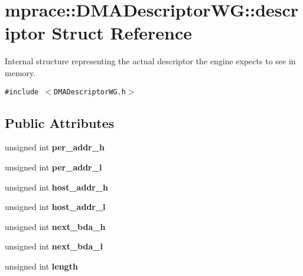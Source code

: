 \hypertarget{structmprace_1_1DMADescriptorWG_1_1descriptor}{
\section{mprace::DMADescriptor\-WG::descriptor Struct Reference}
\label{structmprace_1_1DMADescriptorWG_1_1descriptor}
}
Internal structure representing the actual descriptor the engine expects to see in memory.  


{\tt \#include $<$DMADescriptor\-WG.h$>$}

\subsection*{Public Attributes}
\begin{CompactItemize}
\item 
\hypertarget{structmprace_1_1DMADescriptorWG_1_1descriptor_o0}{
unsigned int {\bf per\_\-addr\_\-h}}
\label{structmprace_1_1DMADescriptorWG_1_1descriptor_o0}

\item 
\hypertarget{structmprace_1_1DMADescriptorWG_1_1descriptor_o1}{
unsigned int {\bf per\_\-addr\_\-l}}
\label{structmprace_1_1DMADescriptorWG_1_1descriptor_o1}

\item 
\hypertarget{structmprace_1_1DMADescriptorWG_1_1descriptor_o2}{
unsigned int {\bf host\_\-addr\_\-h}}
\label{structmprace_1_1DMADescriptorWG_1_1descriptor_o2}

\item 
\hypertarget{structmprace_1_1DMADescriptorWG_1_1descriptor_o3}{
unsigned int {\bf host\_\-addr\_\-l}}
\label{structmprace_1_1DMADescriptorWG_1_1descriptor_o3}

\item 
\hypertarget{structmprace_1_1DMADescriptorWG_1_1descriptor_o4}{
unsigned int {\bf next\_\-bda\_\-h}}
\label{structmprace_1_1DMADescriptorWG_1_1descriptor_o4}

\item 
\hypertarget{structmprace_1_1DMADescriptorWG_1_1descriptor_o5}{
unsigned int {\bf next\_\-bda\_\-l}}
\label{structmprace_1_1DMADescriptorWG_1_1descriptor_o5}

\item 
\hypertarget{structmprace_1_1DMADescriptorWG_1_1descriptor_o6}{
unsigned int {\bf length}}
\label{structmprace_1_1DMADescriptorWG_1_1descriptor_o6}


\end{CompactItemize}
